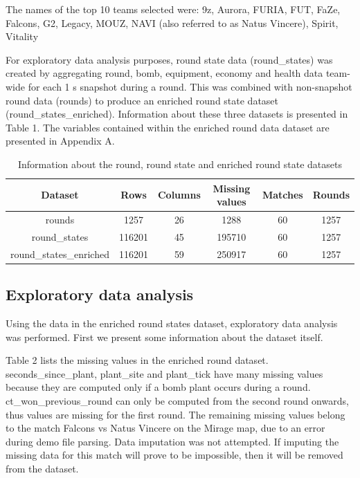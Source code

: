 \documentclass[twoside,11pt]{article}
\begin{document}
The names of the top 10 teams selected were: 9z, Aurora, FURIA, FUT, FaZe, Falcons, G2, Legacy,
MOUZ, NAVI (also referred to as Natus Vincere), Spirit, Vitality

For exploratory data analysis purposes, round state data (round\_states) was created by aggregating
round, bomb, equipment, economy and health data team-wide for each 1 s snapshot during a round. This
was combined with non-snapshot round data (rounds) to produce an enriched round state dataset
(round\_states\_enriched). Information about these three datasets is presented in Table 1. The
variables contained within the enriched round data dataset are presented in Appendix A.

\begin{table}[H]
  \centering
  \caption{Information about the round, round state and enriched round state datasets}
  \label{tab:placeholder}
  \begin{tabular}{|c|c|c|c|c|c|}\hline
    Dataset & Rows & Columns & Missing values & Matches & Rounds\\
    \hline
    rounds & 1257 & 26 & 1288 & 60 & 1257 \\
    \hline
    round\_states & 116201 & 45 & 195710 & 60 & 1257 \\
    \hline
    round\_states\_enriched & 116201 & 59 & 250917 & 60 & 1257 \\
    \hline
  \end{tabular}
\end{table}

\subsection{Exploratory data analysis}

Using the data in the enriched round states dataset, exploratory data analysis was performed. First
we present some information about the dataset itself.

Table 2 lists the missing values in the enriched round dataset. seconds\_since\_plant, plant\_site
and plant\_tick have many missing values because they are computed only if a bomb plant occurs
during a round. ct\_won\_previous\_round can only be computed from the second round onwards, thus
values are missing for the first round. The remaining missing values belong to the match Falcons vs
Natus Vincere on the Mirage map, due to an error during demo file parsing. Data imputation was not
attempted. If imputing the missing data for this match will prove to be impossible, then it will be
removed from the dataset.
\end{document}
